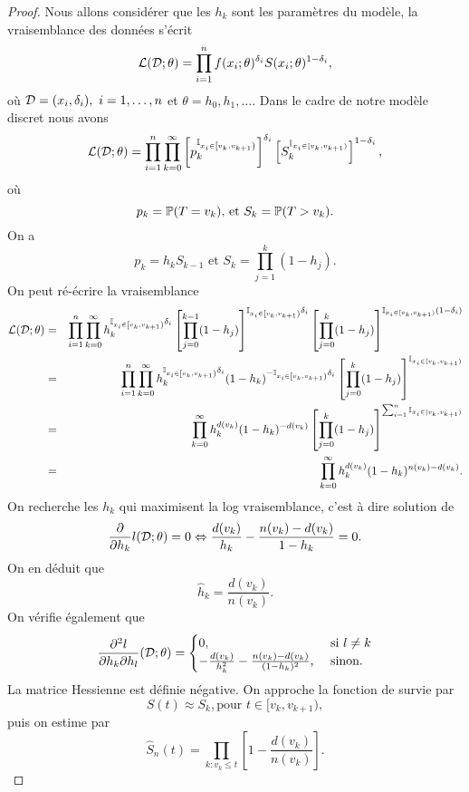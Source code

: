 \begin{proof}
Nous allons considérer que les $h_k$ sont les paramètres du modèle, la vraisemblance des données s'écrit 
$$
\mathcal{L}(\Data;\theta) = \prod_{i=1}^n f(x_i; \theta)^{\delta_i}S(x_i;\theta)^{1-\delta_i},
$$
où $\Data = (x_i,\delta_i),\text{ }i = 1,\ldots, n$ et $\theta = h_0, h_1,\ldots$. Dans le cadre de notre modèle discret nous avons
$$
\mathcal{L}(\Data;\theta) = \prod_{i=1}^n \prod_{k=0}^\infty \left[p_k^{\ind_{x_i\in\left[v_k,v_{k+1}\right)}}\right]^{\delta_i}
\left[S_k^{\ind_{x_i\in[v_k,v_{k+1})}}\right]^{1-\delta_i},
$$
où
$$
p_k = \Prob(T = v_k)\text{, et }S_k = \Prob(T > v_k).
$$
On a 
$$
p_k = h_k S_{k-1}\text{ et }S_k = \prod_{j = 1}^k(1-h_j).
$$
On peut ré-écrire la vraisemblance
\begin{eqnarray*}
\mathcal{L}(\mathcal{D};\theta) &=& \prod_{i=1}^n \prod_{k=0}^\infty h_k^{\mathbb{I}_{x_i\in\left[v_k,v_{k+1}\right)}\delta_i}\left[\prod_{j=0}^{k-1}(1-h_j)\right]^{\mathbb{I}_{x_i\in\left[v_k,v_{k+1}\right)}\delta_i}
\left[\prod_{j=0}^{k}(1-h_j)\right]^{\mathbb{I}_{x_i\in[v_k,v_{k+1})}(1-\delta_i)}\\
&=& \prod_{i=1}^n \prod_{k=0}^\infty h_k^{\mathbb{I}_{x_i\in\left[v_k,v_{k+1}\right)}\delta_i}(1-h_k)^{-\mathbb{I}_{x_i\in\left[v_k,v_{k+1}\right)}\delta_i}
\left[\prod_{j=0}^{k}(1-h_j)\right]^{\mathbb{I}_{x_i\in[v_k,v_{k+1})}}\\
&=& \prod_{k=0}^\infty h_k^{d(v_k)}(1-h_k)^{-d(v_k)}\left[\prod_{j=0}^{k}(1-h_j)\right]^{\sum_{i = 1}^n\mathbb{I}_{x_i\in[v_k,v_{k+1})}}\\
&=& \prod_{k=0}^\infty h_k^{d(v_k)}(1-h_k)^{n(v_k)-d(v_k)}.
\end{eqnarray*}
On recherche les $h_k$ qui maximisent la log vraisemblance, c'est à dire solution de
$$
\frac{\partial}{\partial h_k}l(\Data;\theta) = 0\Leftrightarrow \frac{d(v_k)}{h_k}-\frac{n(v_k)-d(v_k)}{1-h_k}=0.
$$
On en déduit que
$$
\widehat{h}_k = \frac{d(v_k)}{n(v_k)}.
$$
On vérifie également que 
$$
\frac{\partial^2 l}{\partial h_k\partial h_l} (\Data;\theta)=\begin{cases}
0,&\text{ si }l\neq k\\
-\frac{d(v_k)}{h_k^2}-\frac{n(v_k)-d(v_k)}{(1-h_k)^2},&\text{ sinon.}

\end{cases}
$$
La matrice Hessienne est définie négative. On approche la fonction de survie par 
$$
S(t)\approx S_k,\text{pour }t\in [v_k,v_{k+1}),
$$
puis on estime par 
$$
\widehat{S}_n(t)=\prod_{k:v_k\leq t}\left[1-\frac{d(v_k)}{n(v_k)}\right].
$$
\end{proof}
